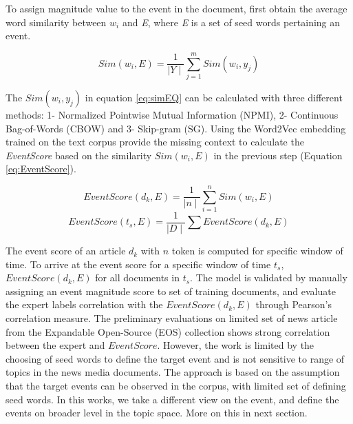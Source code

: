 To assign magnitude value to the event in the  document, \cite{Agrawal2016DetectingTM} first obtain the average word similarity between $w_i$ and \textit{E}, where \textit{E} is a set of seed words pertaining an event. 

\begin{equation}\label{eq:simEQ}
Sim (w_i, E) =  \frac{1}{\mid Y\mid}    \sum_{j=1}^{m} Sim(w_i, y_j)
\end{equation}

The $Sim (w_i, y_j)$ in equation \ref{eq:simEQ} can be calculated with three different methods: 1- Normalized Pointwise Mutual Information (NPMI), 2- Continuous Bag-of-Words (CBOW) and 3- Skip-gram (SG). Using the Word2Vec embedding \cite{Mikolov} trained on the text corpus provide the missing context to calculate the \textit{EventScore} based on the similarity $Sim (w_i, E)$ in the previous step (Equation \ref{eq:EventScore}). 

\begin{equation}\label{eq:EventScore}
EventScore (d_k, E) =  \frac{1}{\mid n\mid}    \sum_{i=1}^{n} Sim(w_i, E)
\end{equation}
\vspace{-1em}
\begin{equation}\label{eq:EventScore1}
EventScore (t_s, E) =  \frac{1}{\mid D\mid}    \sum EventScore(d_k, E)
\end{equation}

The event score of an article $d_k$ with $n$ token is computed for specific window of time. To arrive at the event score for a specific window of time $t_s$, $EventScore(d_k, E)$ for all documents in $t_s$. The model is validated by manually assigning an event magnitude score to set of training documents, and evaluate the expert labels correlation with the $EventScore (d_k, E)$ through Pearson's correlation measure. The preliminary evaluations on limited set of news article from the Expandable Open-Source (EOS) collection shows strong correlation between the expert and $EventScore.$ However, the work is limited by the choosing of seed words to define the target event and is not sensitive to range of topics in the news media documents. The approach is based on the assumption that the target events can be observed in the corpus, with limited set of defining seed words. In this works, we take a different view on the event, and define the events on broader level in the topic space. More on this in next section. 


